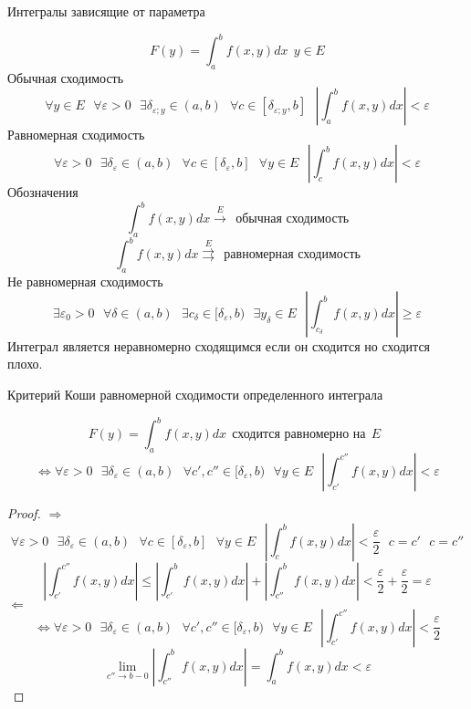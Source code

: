 \begin{title}
  Интегралы зависящие от параметра
\end{title}

\begin{define}
  $$
  F(y) = \int_a^b f(x,y) dx ~~ y \in E
  $$
  Обычная сходимость
  $$
  \forall y \in E
  ~~~
  \forall \varepsilon > 0
  ~~~
  \exists \delta_{\varepsilon; y} \in (a, b)
  ~~~
  \forall c \in [\delta_{\varepsilon; y}, b]
  ~~~
  \left|
    \int_a^b f(x,y) dx
  \right|
  < \varepsilon
  $$
  Равномерная сходимость
  $$
  \forall \varepsilon > 0
  ~~~
  \exists \delta_{\varepsilon} \in (a,b)
  ~~~
  \forall c \in [\delta_{\varepsilon}, b]
  ~~~
  \forall y \in E
  ~~~
  \left|
    \int_c^b f(x,y) dx
  \right|
  < \varepsilon
  $$
  Обозначения
  $$
  \int_a^b f(x,y) dx \stackrel{E}{\to} ~~ \text{обычная сходимость}
  $$
  $$
  \int_a^b f(x,y) dx \stackrel{E}{\rightrightarrows} ~~
  \text{равномерная сходимость}
  $$
  Не равномерная сходимость
  $$
  \exists \varepsilon_0 > 0
  ~~~
  \forall \delta \in (a,b)
  ~~~
  \exists c_{\delta} \in [\delta_{\varepsilon}, b)
  ~~~
  \exists y_{\delta} \in E
  ~~~
  \left|
    \int_{c_{\delta}}^b f(x,y) dx
  \right|
  \ge \varepsilon
  $$
  Интеграл является неравномерно сходящимся если он сходится но сходится плохо.
\end{define}

\begin{title}[\Large]
  Критерий Коши равномерной сходимости определенного интеграла
\end{title}

\begin{block}
  $$
  F(y) = \int_a^b f(x,y) dx ~~ \text{сходится равномерно на} ~~ E ~~
  $$
  $$
  \Leftrightarrow
  \forall \varepsilon > 0
  ~~~
  \exists \delta_{\varepsilon} \in (a,b)
  ~~~
  \forall c', c'' \in [\delta_{\varepsilon}, b)
  ~~~
  \forall y \in E
  ~~~
  \left|
    \int_{c'}^{c''} f(x,y) dx
  \right|
  < \varepsilon
  $$
\end{block}

\begin{proof}
  $\Rightarrow$
  $$
  \forall \varepsilon > 0
  ~~~
  \exists \delta_{\varepsilon} \in (a,b)
  ~~~
  \forall c \in [\delta_{\varepsilon}, b]
  ~~~
  \forall y \in E
  ~~~
  \left|
    \int_c^b f(x,y) dx
  \right|
  < \frac{\varepsilon}{2}
  ~~~
  c = c'
  ~~~
  c = c''
  $$
  $$
  \left|
    \int_{c'}^{c''} f(x,y) dx
  \right|
  \le
  \left|
    \int_{c'}^{b} f(x,y) dx
  \right|
  +
  \left|
    \int_{c''}^{b} f(x,y) dx
  \right|
  <
  \frac{\varepsilon}{2} + \frac{\varepsilon}{2} = \varepsilon
  $$
  $\Leftarrow$
  $$
  \Leftrightarrow
  \forall \varepsilon > 0
  ~~~
  \exists \delta_{\varepsilon} \in (a,b)
  ~~~
  \forall c', c'' \in [\delta_{\varepsilon}, b)
  ~~~
  \forall y \in E
  ~~~
  \left|
    \int_{c'}^{c''} f(x,y) dx
  \right|
  < \frac{\varepsilon}{2}
  $$
  $$
  \lim_{c'' \to b -0}
    \left|
      \int_{c''}^{b} f(x,y) dx
    \right|
  =
  \int_{a}^{b} f(x,y) dx
  < \varepsilon
  $$
\end{proof}

